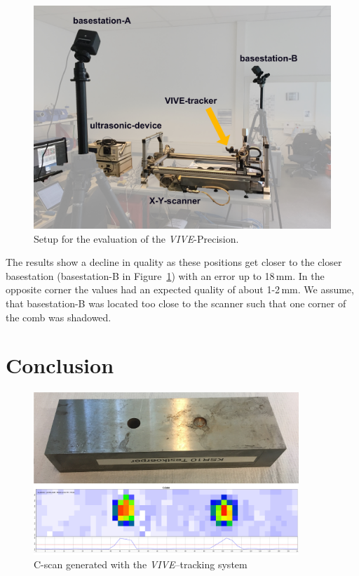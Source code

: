 \documentclass{VRARWorkshop}
\begin{document}
\begin{figure}[h!]
    \begin{center}
        \includegraphics[width=120mm]{images/PrecisionMeasurement}
        \caption{\label{fig:precisionMeasurementSetup} Setup for the evaluation of the \textit{VIVE}-Precision.}
    \end{center}
\end{figure}

The results show a decline in quality as these positions get closer to the closer basestation (basestation-B in Figure~\ref{fig:precisionMeasurementSetup}) with an error up to 18\,mm.
In the opposite corner the values had an expected quality of about 1-2\,mm.
We assume, that basestation-B was located too close to the scanner such that one corner of the comb was shadowed.

\section{Conclusion}

\begin{figure}[h!]
    \begin{center}
        \includegraphics[width=100mm]{images/CScanARUS}
        \caption{\label{fig:resultCScan} C-scan generated with the \textit{VIVE}--tracking system}
    \end{center}
\end{figure}
\end{document}
